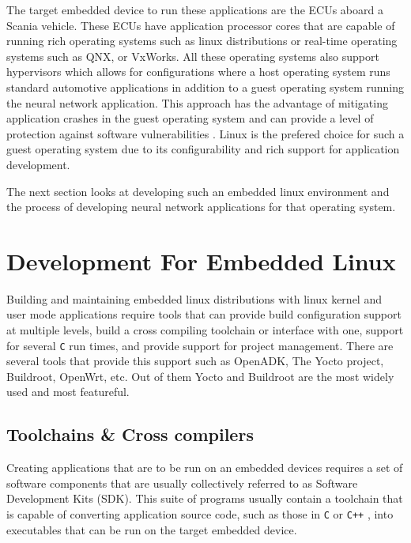 The target embedded device to run these applications are the ECUs aboard a Scania vehicle. These ECUs have application processor cores that are capable of running rich operating systems such as linux distributions or real-time operating systems such as QNX, or VxWorks. All these operating systems also support hypervisors which allows for configurations where a host operating system runs standard automotive applications in addition to a guest operating system running the neural network application. This approach has the advantage of mitigating application crashes in the guest operating system and can provide a level of protection against software vulnerabilities \cite{linux-guest-os}. Linux is the prefered choice for such a guest operating system due to its configurability and rich support for application development.

The next section looks at developing such an embedded linux environment and the process of developing neural network applications for that operating system.

\section[Development Process for Embedded Linux]{Development For Embedded Linux}

Building and maintaining embedded linux distributions with linux kernel and user mode applications require tools that can provide build configuration support at multiple levels, build a cross compiling toolchain or interface with one, support for several \verb!C! run times, and provide support for project management. There are several tools that provide this support such as OpenADK, The Yocto project, Buildroot, OpenWrt, etc. Out of them Yocto and Buildroot are the most widely used and most featureful.

\subsection[SDKs \& Compiler Toolchains]{Toolchains \& Cross compilers}

Creating applications that are to be run on an embedded devices requires a set of software components that are usually collectively referred to as Software Development Kits (SDK). This suite of programs usually contain a toolchain that is capable of converting application source code, such as those in \verb!C!  or \verb!C++! , into executables that can be run on the target embedded device.

